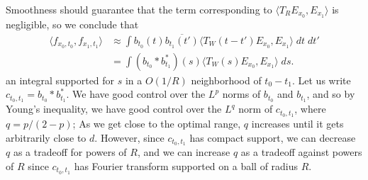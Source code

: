 %
Smoothness should guarantee that the term corresponding to $\langle T_R E_{x_0}, E_{x_1} \rangle$ is negligible, so we conclude that
%
\begin{align*}
    \langle f_{x_0,t_0}, f_{x_1,t_1} \rangle &\approx \int b_{t_0}(t) \overline{b_{t_1}(t')} \langle T_W(t-t') E_{x_0}, E_{x_1} \rangle\; dt\; dt'\\
    &= \int (b_{t_0} * b_{t_1}^*)(s) \langle T_W(s) E_{x_0}, E_{x_1} \rangle\; ds.
\end{align*}
%
an integral supported for $s$ in a $O(1/R)$ neighborhood of $t_0-t_1$. Let us write $c_{t_0,t_1} = b_{t_0} * b_{t_1}^*$. We have good control over the $L^p$ norms of $b_{t_0}$ and $b_{t_1}$, and so by Young's inequality, we have good control over the $L^q$ norm of $c_{t_0,t_1}$, where $q = p/(2-p)$; As we get close to the optimal range, $q$ increases until it gets arbitrarily close to $d$. However, since $c_{t_0,t_1}$ has compact support, we can decrease $q$ as a tradeoff for powers of $R$, and we can increase $q$ as a tradeoff against powers of $R$ since $c_{t_0,t_1}$ has Fourier transform supported on a ball of radius $R$.

